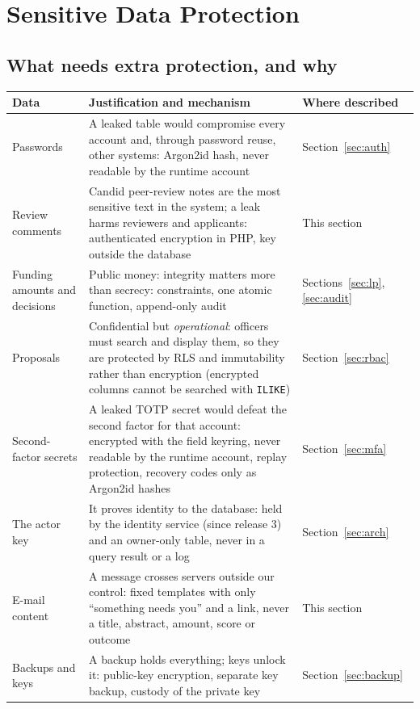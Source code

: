 \documentclass[10pt,a4paper]{article}
\newcommand{\code}[1]{\nolinkurl{#1}}
\begin{document}
\section{Sensitive Data Protection}\label{sec:data}

\subsection{What needs extra protection, and why}
\begin{center}\small
\begin{tabularx}{\linewidth}{@{}L{3.5cm}YL{3.4cm}@{}}
\toprule\textbf{Data} & \textbf{Justification and mechanism} & \textbf{Where described}\\\midrule
Passwords & A leaked table would compromise every account and, through password reuse, other systems: Argon2id hash, never readable by the runtime account & Section~\ref{sec:auth}\\
Review comments & Candid peer-review notes are the most sensitive text in the system; a leak harms reviewers and applicants: authenticated encryption in PHP, key outside the database & This section\\
Funding amounts and decisions & Public money: integrity matters more than secrecy: constraints, one atomic function, append-only audit & Sections~\ref{sec:lp}, \ref{sec:audit}\\
Proposals & Confidential but \emph{operational}: officers must search and display them, so they are protected by RLS and immutability rather than encryption (encrypted columns cannot be searched with \code{ILIKE}) & Section~\ref{sec:rbac}\\
Second-factor secrets & A leaked TOTP secret would defeat the second factor for that account: encrypted with the field keyring, never readable by the runtime account, replay protection, recovery codes only as Argon2id hashes & Section~\ref{sec:mfa}\\
The actor key & It proves identity to the database: held by the identity service (since release 3) and an owner-only table, never in a query result or a log & Section~\ref{sec:arch}\\
E-mail content & A message crosses servers outside our control: fixed templates with only ``something needs you'' and a link, never a title, abstract, amount, score or outcome & This section\\
Backups and keys & A backup holds everything; keys unlock it: public-key encryption, separate key backup, custody of the private key & Section~\ref{sec:backup}\\
\bottomrule\end{tabularx}\end{center}
\end{document}
